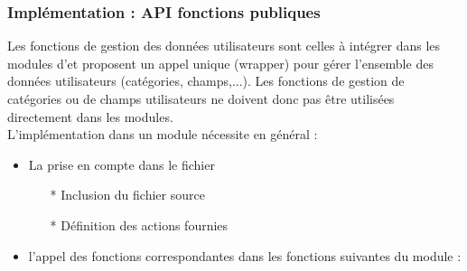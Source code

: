 

\subsubsection{Implémentation : API fonctions publiques}

Les fonctions de gestion des données utilisateurs sont celles à intégrer dans les modules d'\obm et proposent un appel unique (wrapper) pour gérer l'ensemble des données utilisateurs (catégories, champs,...).
Les fonctions de gestion de catégories ou de champs utilisateurs ne doivent donc pas être utilisées directement dans les modules.\\

L'implémentation dans un module nécessite en général :
\begin{itemize}
\item La prise en compte dans le fichier 
  \begin{itemize}
  \item[*] Inclusion du fichier source\\

  \item[*] Définition des actions fournies\\

  \end{itemize}
\item l'appel des fonctions correspondantes dans les fonctions suivantes du module :
\end{itemize}

